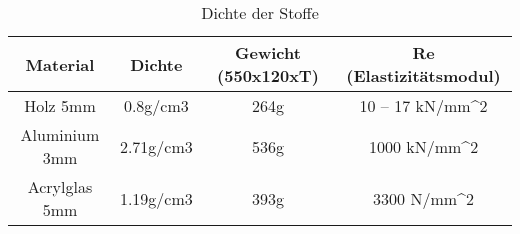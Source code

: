 \begin{table}
	\centering
	\caption{Dichte der Stoffe}
	\label{tab:(http://schulmodell.eu/index.php/physik/503-dichte-fester-stoffe.html)}

	\begin{tabular}{|c|c|c|c|}
		\hline Material & Dichte & Gewicht (550x120xT) & Re (Elastizitätsmodul) \\ 
		\hline Holz 5mm & 0.8g/cm3 & 264g & 10 – 17 kN/mm^2 \\ 
		\hline Aluminium 3mm & 2.71g/cm3 & 536g & 1000 kN/mm^2 \\ 
		\hline Acrylglas 5mm & 1.19g/cm3 & 393g & 3300 N/mm^2  \\ 
		\hline 
	\end{tabular} 
\end{table}
 		
 			

